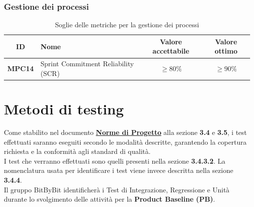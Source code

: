 \documentclass[a4paper,12pt]{article}
\begin{document}
\subsubsection{Gestione dei processi}\label{sec:gestione-processi}
\begin{table}[H]
\centering
\renewcommand{\arraystretch}{1.5}
\begin{tabularx}{\textwidth}{|c|Y|c|c|}
\hline
{} \textbf{ID} & \textbf{Nome} & \textbf{Valore accettabile} & \textbf{Valore ottimo} \\ \hline
\textbf{MPC14} & Sprint Commitment Reliability (SCR) & $\ge 80\%$ & $\ge 90\%$ \\ \hline
\end{tabularx}
\caption{Soglie delle metriche per la gestione dei processi}
\end{table}

\section{Metodi di testing} \label{sec:metodi_testing}
Come stabilito nel documento \href{https://swe-bitbybit.github.io/SWE-docs/docs/RTB/documenti_interni/norme_di_progetto.pdf}{\textbf{Norme di Progetto}} alla sezione \textbf{3.4} e \textbf{3.5}, i test effettuati saranno eseguiti secondo le modalità descritte, garantendo la copertura richiesta e la conformità agli standard di qualità.\\
I test che verranno effettuati sono quelli presenti nella sezione \textbf{3.4.3.2}. La nomenclatura usata per identificare i test viene invece descritta nella sezione \textbf{3.4.4}.\\
Il gruppo BitByBit identificherà i Test di Integrazione, Regressione e Unità durante lo svolgimento delle attività per la \textbf{Product Baseline (PB)}.

\clearpage
\begingroup
\end{document}
